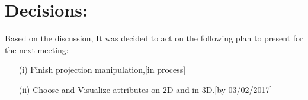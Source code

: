 \documentclass[a4paper, 11pt]{article}
\begin{document}
	\section*{Decisions:}
	
	Based on the discussion, It was decided to act on the following plan to present for the next meeting:
	\begin{itemize}
		\item[(i)] Finish projection manipulation,\hfill {\color{RedOrange}[in process]}
		\item[(ii)] Choose and Visualize attributes on 2D and in 3D.\hfill {\color{Red}[by 03/02/2017]}
	\end{itemize}
\end{document}
